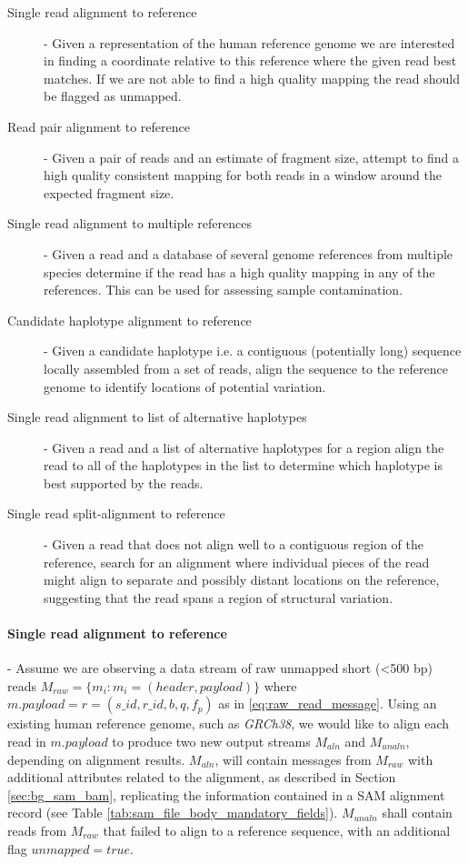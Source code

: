 \begin{description}
    \item [Single read alignment to reference] - Given a representation of the human reference genome we are interested in finding a coordinate relative to this reference where the given read best matches. If we are not able to find a high quality mapping the read should be flagged as unmapped.
    \item [Read pair alignment to reference] - Given a pair of reads and an estimate of fragment size, attempt to find a high quality consistent mapping for both reads in a window around the expected fragment size.
    \item [Single read alignment to multiple references] - Given a read and a database of several genome references from multiple species determine if the read has a high quality mapping in any of the references. This can be used for assessing sample contamination.
    \item [Candidate haplotype alignment to reference] - Given a candidate haplotype i.e. a contiguous (potentially long) sequence locally assembled from a set of reads, align the sequence to the reference genome to identify locations of potential variation.
    \item [Single read alignment to list of alternative haplotypes] - Given a read and a list of alternative haplotypes for a region align the read to all of the haplotypes in the list to determine which haplotype is best supported by the reads.
    \item [Single read split-alignment to reference] - Given a read that does not align well to a contiguous region of the reference, search for an alignment where individual pieces of the read might align to separate and possibly distant locations on the reference, suggesting that the read spans a region of structural variation.
\end{description}

\paragraph{Single read alignment to reference} - Assume we are observing a data stream of raw unmapped short (<500 bp) reads $M_{raw} = \{m_i: m_i = (header, payload)\}$ where $m.payload = r = (s\_id, r\_id, b, q, f_p)$ as in \ref{eq:raw_read_message}. Using an existing human reference genome, such as \emph{GRCh38}, we would like to align each read in $m.payload$ to produce two new output streams $M_{aln}$ and $M_{unaln}$, depending on alignment results. $M_{aln}$, will contain messages from $M_{raw}$ with additional attributes related to the alignment, as described in Section \ref{sec:bg_sam_bam}, replicating the information contained in a SAM alignment record (see Table \ref{tab:sam_file_body_mandatory_fields}). $M_{unaln}$ shall contain reads from $M_{raw}$ that failed to align to a reference sequence, with an additional flag $unmapped=true$.

